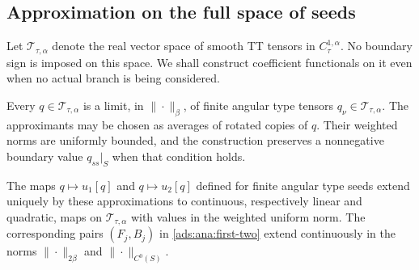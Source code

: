 \subsection{Approximation on the full space of seeds}

Let $\mathscr T_{\tau,\alpha}$ denote the real vector space of smooth
TT tensors in $C^{1,\alpha}_\tau$.  No boundary sign is imposed on
this space.  We shall construct coefficient functionals on it even
when no actual branch is being considered.

\begin{lemma}
\label{ads:lem:rotation}
Every $q\in\mathscr T_{\tau,\alpha}$ is a limit, in $\|\cdot\|_\beta$,
of finite angular type tensors $q_\nu\in\mathscr T_{\tau,\alpha}$.
The approximants may be chosen as averages of rotated copies of $q$.
Their weighted norms are uniformly bounded, and the construction
preserves a nonnegative boundary value $q_{ss}|_S$ when that condition
holds.

The maps $q\mapsto u_1[q]$ and $q\mapsto u_2[q]$ defined for finite
angular type seeds extend uniquely by these approximations to
continuous, respectively linear and quadratic, maps on
$\mathscr T_{\tau,\alpha}$ with values in the weighted uniform norm.
The corresponding pairs $(F_j,B_j)$ in \eqref{ads:ana:first-two}
extend continuously in the norms $\|\cdot\|_{2\beta}$ and
$\|\cdot\|_{C^0(S)}$.
\end{lemma}

